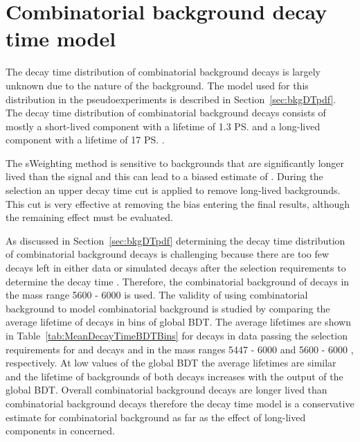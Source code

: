 \section{Combinatorial background decay time model}
\label{sec:CBGdecytimemodel}

The decay time distribution of combinatorial background decays is largely unknown due to the nature of the background. The model used for this distribution in the pseudoexperiments is described in Section~\ref{sec:bkgDTpdf}. The decay time distribution of combinatorial background decays consists of mostly a short-lived component with a lifetime of 1.3 \ps and a long-lived component with a lifetime of 17 \ps.

The sWeighting method is sensitive to backgrounds that are significantly longer lived than the signal and this can lead to a biased estimate of \tmumu. 
During the selection an upper decay time cut is applied to remove long-lived backgrounds. This cut is very effective at removing the bias entering the final results, although the remaining effect must be evaluated.

As discussed in Section~\ref{sec:bkgDTpdf} determining the decay time distribution of combinatorial background decays is challenging because there are too few decays left in either data or \bbbarmumux simulated decays after the selection requirements to determine the decay time \pdf. Therefore, the combinatorial background of \bhh decays in the mass range 5600 - 6000 \mevcc is used. The validity of using \bhh combinatorial background to model \bsmumu combinatorial background is studied by comparing the average lifetime of decays in bins of global BDT. The average lifetimes are shown in Table~\ref{tab:MeanDecayTimeBDTBins} for decays in data passing the selection requirements for \bsmumu and \bhh decays and in the mass ranges 5447 - 6000 \mevcc and 5600 - 6000 \mevcc, respectively. At low values of the global BDT the average lifetimes are similar and the lifetime of backgrounds of both decays increases with the output of the global BDT. Overall \bhh combinatorial background decays are longer lived than \bsmumu combinatorial background decays therefore the \bhh decay time model is a conservative estimate for \bsmumu combinatorial background as far as the effect of long-lived components in concerned. 



